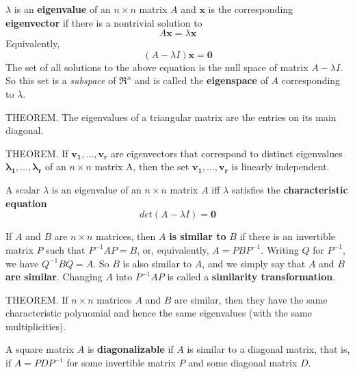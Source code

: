 \documentclass{article}
\begin{document}
$\lambda$ is an \textbf{eigenvalue} of an $n \times n$ matrix $A$ and  \(\textbf{x}\) is the corresponding \textbf{eigenvector} if there is a nontrivial solution to 
\begin{equation}
    A \textbf{x} = \lambda \textbf{x}
\end{equation}
Equivalently, 
\begin{equation}
    (A-\lambda I)\mathbf{x} = \mathbf{0}
\end{equation}
The set of all solutions to the above equation is the null space of matrix $A-\lambda I$. So this set is a \textit{subspace} of $\Re^n$ and is called the \textbf{eigenspace} of $A$ corresponding to $\lambda$.

\hfill \newline THEOREM. The eigenvalues of a triangular matrix are the entries on its main diagonal.

\hfill \newline THEOREM. If $\mathbf{v_1},\dots,\mathbf{v_r}$ are eigenvectors that correspond to distinct eigenvalues $\mathbf{\lambda_1},\dots,\mathbf{\lambda_r}$ of an $n \times n$ matrix A, then the set {$\mathbf{v_1},\dots,\mathbf{v_r}$} is linearly independent.

\hfill \newline A scalar $\lambda$ is an eigenvalue of an $n \times n$ matrix $A$ iff $\lambda$ satisfies the \textbf{characteristic equation}
\begin{equation}
    det(A-\lambda I) = \mathbf{0}
\end{equation}

\hfill \newline If $A$ and $B$ are $n \times n$ matrices, then $A$ \textbf{is similar to} $B$ if there is an invertible matrix $P$ such that $P^{-1}AP=B$, or, equivalently, $A = PBP^{-1}$. Writing $Q$ for $P^{-1}$, we have $Q^{-1}BQ=A$. So $B$ is also similar to $A$, and we simply say that $A$ and $B$ \textbf{are similar}. Changing $A$ into $P^{-1}AP$ is called a \textbf{similarity transformation}.

\hfill \newline THEOREM. If $n \times n$ matrices $A$ and $B$ are similar, then they have the same characteristic polynomial and hence the same eigenvalues (with the same multiplicities).

\hfill \newline A square matrix $A$ is \textbf{diagonalizable} if $A$ is similar to a diagonal matrix, that is, if $A=PDP^{-1}$ for some invertible matrix $P$ and some diagonal matrix $D$.
\end{document}

